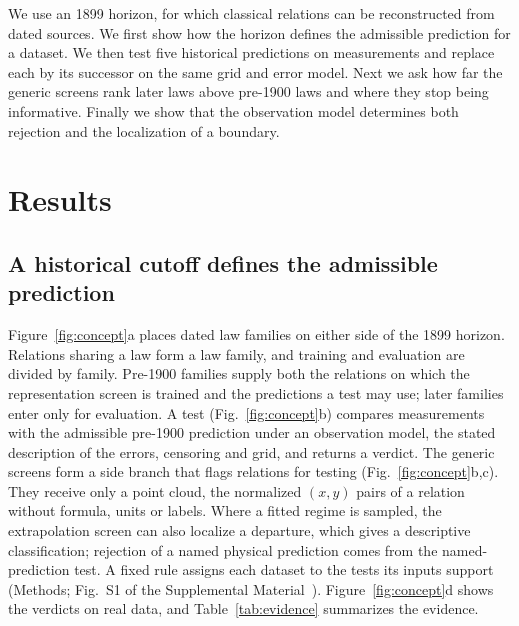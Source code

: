 \documentclass{article}
\begin{document}
We use an 1899 horizon, for which classical relations can be reconstructed from dated sources. We first show how the horizon defines the admissible prediction for a dataset. We then test five historical predictions on measurements and replace each by its successor on the same grid and error model. Next we ask how far the generic screens rank later laws above pre-1900 laws and where they stop being informative. Finally we show that the observation model determines both rejection and the localization of a boundary.

\section{Results}

\subsection{A historical cutoff defines the admissible prediction}

Figure~\ref{fig:concept}a places dated law families on either side of the 1899 horizon. Relations sharing a law form a law family, and training and evaluation are divided by family. Pre-1900 families supply both the relations on which the representation screen is trained and the predictions a test may use; later families enter only for evaluation. A test (Fig.~\ref{fig:concept}b) compares measurements with the admissible pre-1900 prediction under an observation model, the stated description of the errors, censoring and grid, and returns a verdict. The generic screens form a side branch that flags relations for testing (Fig.~\ref{fig:concept}b,c). They receive only a point cloud, the normalized $(x, y)$ pairs of a relation without formula, units or labels. Where a fitted regime is sampled, the extrapolation screen can also localize a departure, which gives a descriptive classification; rejection of a named physical prediction comes from the named-prediction test. A fixed rule assigns each dataset to the tests its inputs support (Methods; Fig.~S1 of the Supplemental Material~\cite{SM}). Figure~\ref{fig:concept}d shows the verdicts on real data, and Table~\ref{tab:evidence} summarizes the evidence.
\end{document}
